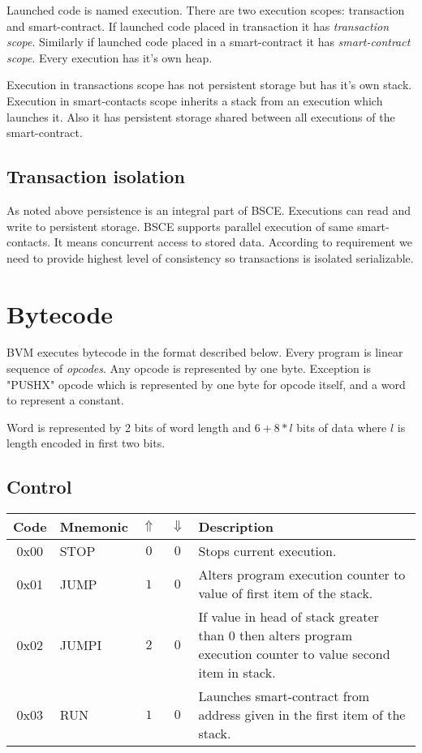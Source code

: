 \documentclass[12pt,a4paper]{article}
\begin{document}
Launched code is named execution. There are two execution scopes: transaction and smart-contract. If launched code placed in transaction it has \textit{transaction scope}. Similarly if launched code placed in a smart-contract it has \textit{smart-contract scope}. Every execution has it's own heap. 

Execution in transactions scope has not persistent storage but has it's own stack. Execution in smart-contacts scope inherits a stack from an execution which launches it. Also it has persistent storage shared between all executions of the smart-contract.

\subsection{Transaction isolation}

As noted above persistence is an integral part of BSCE. Executions can read and write to persistent storage. BSCE supports parallel execution of same smart-contacts. It means concurrent access to stored data. According to requirement we need to provide highest level of consistency so transactions is isolated serializable\cite{transaction-isolation}. 

\section{Bytecode}

BVM executes bytecode in the format described below. Every program is linear sequence of \textit{opcodes}. Any opcode is represented by one byte. Exception is "PUSHX" opcode which is represented by one byte for opcode itself, and a word to represent a constant.

Word is represented by 2 bits of word length and $6+8*l$ bits of data where $l$ is length encoded in first two bits.

\subsection{Control}
\begin{tabularx}{\textwidth}{ c l c c p{7cm} }
\textbf{Code} & \textbf{Mnemonic} & \textbf{$\Uparrow$} & \textbf{$\Downarrow$} & \textbf{Description} \\
\hline
0x00 & STOP & $0$ & $0$ & Stops current execution. \\
\hline
0x01 & JUMP & $1$ & $0$ & Alters program execution counter to value of first item of the stack. \\
\hline
0x02 & JUMPI & $2$ & $0$ & If value in head of stack greater than 0 then alters program execution counter to value second item in stack.  \\
\hline
0x03 & RUN & $1$ & $0$ & Launches smart-contract from address given in the first item of the stack.  \\
\end{tabularx}
\end{document}
